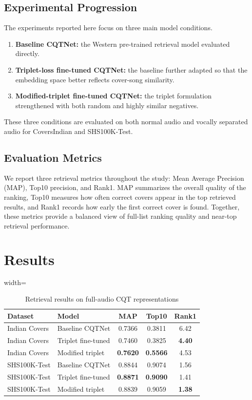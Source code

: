 \documentclass[conference]{IEEEtran}
\begin{document}
\subsection{Experimental Progression}
The experiments reported here focus on three main model conditions.

\begin{enumerate}
    \item \textbf{Baseline CQTNet:} the Western pre-trained retrieval model evaluated directly.
    \item \textbf{Triplet-loss fine-tuned CQTNet:} the baseline further adapted so that the embedding space better reflects cover-song similarity.
    \item \textbf{Modified-triplet fine-tuned CQTNet:} the triplet formulation strengthened with both random and highly similar negatives.
\end{enumerate}

These three conditions are evaluated on both normal audio and vocally separated audio for CoversIndian and SHS100K-Test.

\subsection{Evaluation Metrics}
We report three retrieval metrics throughout the study: Mean Average Precision (MAP), Top10 precision, and Rank1. MAP summarizes the overall quality of the ranking, Top10 measures how often correct covers appear in the top retrieved results, and Rank1 records how early the first correct cover is found. Together, these metrics provide a balanced view of full-list ranking quality and near-top retrieval performance.

\section{Results}

\begin{table}[htbp]
    \caption{Retrieval results on full-audio CQT representations}
    \centering
    \begin{adjustbox}{width=\columnwidth}
    \begin{tabular}{llccc}
    \toprule
    \textbf{Dataset} & \textbf{Model} & \textbf{MAP} & \textbf{Top10} & \textbf{Rank1} \\
    \midrule
    Indian Covers & Baseline CQTNet & 0.7366 & 0.3811 & 6.42 \\
    Indian Covers & Triplet fine-tuned & 0.7460 & 0.3825 & \textbf{4.40} \\
    Indian Covers & Modified triplet & \textbf{0.7620} & \textbf{0.5566} & 4.53 \\
    \midrule
    SHS100K-Test & Baseline CQTNet & 0.8844 & 0.9074 & 1.56 \\
    SHS100K-Test & Triplet fine-tuned & \textbf{0.8871} & \textbf{0.9090} & 1.41 \\
    SHS100K-Test & Modified triplet & 0.8839 & 0.9059 & \textbf{1.38} \\
    \bottomrule
    \end{tabular}
    \end{adjustbox}
\end{table}
\end{document}
